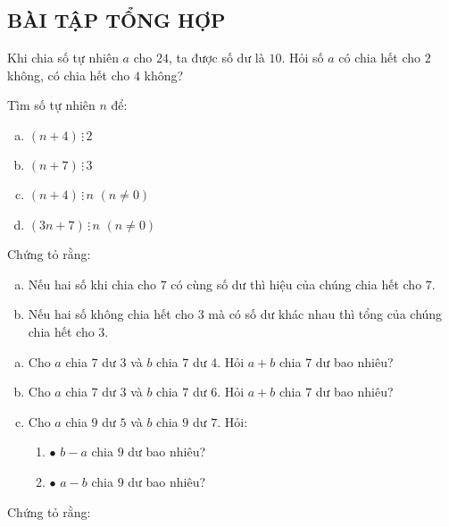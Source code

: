 \begin{bt}
\subsection{BÀI TẬP TỔNG HỢP}
\end{bt}    \begin{bt}
Khi chia số tự nhiên $a$ cho $24$, ta được số dư là $10$. Hỏi số $a$ có chia hết cho $2$ không, có chia hết cho $4$ không?
\end{bt}    \begin{bt}
Tìm số tự nhiên $n$ để:
\begin{enumerate}[a)]
\item $\left( {n + 4} \right) \,\vdots \,2$
\item $\left( {n + 7} \right) \,\vdots \,3$
\item $\left( {n + 4} \right) \,\vdots \,n$ $\left( {n \ne 0} \right)$
\item $\left( {3n + 7} \right) \,\vdots \,n$ $\left( {n \ne 0} \right)$
\end{enumerate}
\end{bt}    \begin{bt}
Chứng tỏ rằng:
\begin{enumerate}[a)]
\item Nếu hai số khi chia cho $7$ có cùng số dư thì hiệu của chúng chia hết cho $7$.
\item Nếu hai số không chia hết cho $3$ mà có số dư khác nhau thì tổng của chúng chia hết cho $3$.
\end{enumerate}
\end{bt}    \begin{bt} \qquad
\begin{enumerate}[a)]
\item Cho $a$ chia $7$ dư $3$ và $b$ chia $7$ dư $4$. Hỏi $a + b$ chia $7$ dư bao nhiêu? 
\item Cho $a$ chia $7$ dư $3$ và $b$ chia $7$ dư $6$. Hỏi $a + b$ chia $7$ dư bao nhiêu?
\item Cho $a$ chia $9$ dư $5$ và $b$ chia $9$ dư $7$. Hỏi:
\begin{enumerate}[]
\item $\bullet$ $b - a$ chia $9$ dư bao nhiêu?
\item $\bullet$ $a - b$ chia $9$ dư bao nhiêu? 
\end{enumerate}
\end{enumerate}
\end{bt}    \begin{bt}
Chứng tỏ rằng:
\begin{enumerate}[a)]

\end{enumerate}
\end{bt}
